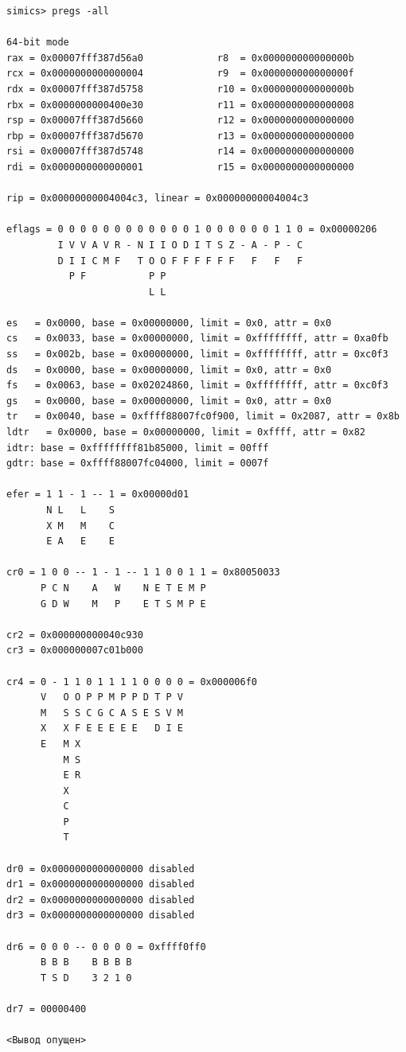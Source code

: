 \begin{lstlisting}
simics> pregs -all

64-bit mode
rax = 0x00007fff387d56a0             r8  = 0x000000000000000b
rcx = 0x0000000000000004             r9  = 0x000000000000000f
rdx = 0x00007fff387d5758             r10 = 0x000000000000000b
rbx = 0x0000000000400e30             r11 = 0x0000000000000008
rsp = 0x00007fff387d5660             r12 = 0x0000000000000000
rbp = 0x00007fff387d5670             r13 = 0x0000000000000000
rsi = 0x00007fff387d5748             r14 = 0x0000000000000000
rdi = 0x0000000000000001             r15 = 0x0000000000000000

rip = 0x00000000004004c3, linear = 0x00000000004004c3

eflags = 0 0 0 0 0 0 0 0 0 0 0 0 1 0 0 0 0 0 0 1 1 0 = 0x00000206
         I V V A V R - N I I O D I T S Z - A - P - C
         D I I C M F   T O O F F F F F F   F   F   F
           P F           P P                        
                         L L                        

es   = 0x0000, base = 0x00000000, limit = 0x0, attr = 0x0
cs   = 0x0033, base = 0x00000000, limit = 0xffffffff, attr = 0xa0fb
ss   = 0x002b, base = 0x00000000, limit = 0xffffffff, attr = 0xc0f3
ds   = 0x0000, base = 0x00000000, limit = 0x0, attr = 0x0
fs   = 0x0063, base = 0x02024860, limit = 0xffffffff, attr = 0xc0f3
gs   = 0x0000, base = 0x00000000, limit = 0x0, attr = 0x0
tr   = 0x0040, base = 0xffff88007fc0f900, limit = 0x2087, attr = 0x8b
ldtr   = 0x0000, base = 0x00000000, limit = 0xffff, attr = 0x82
idtr: base = 0xffffffff81b85000, limit = 00fff
gdtr: base = 0xffff88007fc04000, limit = 0007f

efer = 1 1 - 1 -- 1 = 0x00000d01
       N L   L    S
       X M   M    C
       E A   E    E

cr0 = 1 0 0 -- 1 - 1 -- 1 1 0 0 1 1 = 0x80050033
      P C N    A   W    N E T E M P
      G D W    M   P    E T S M P E

cr2 = 0x000000000040c930
cr3 = 0x000000007c01b000

cr4 = 0 - 1 1 0 1 1 1 1 0 0 0 0 = 0x000006f0
      V   O O P P M P P D T P V
      M   S S C G C A S E S V M
      X   X F E E E E E   D I E
      E   M X
          M S
          E R
          X
          C
          P
          T

dr0 = 0x0000000000000000 disabled
dr1 = 0x0000000000000000 disabled
dr2 = 0x0000000000000000 disabled
dr3 = 0x0000000000000000 disabled

dr6 = 0 0 0 -- 0 0 0 0 = 0xffff0ff0
      B B B    B B B B
      T S D    3 2 1 0

dr7 = 00000400

<Вывод опущен>
\end{lstlisting}


